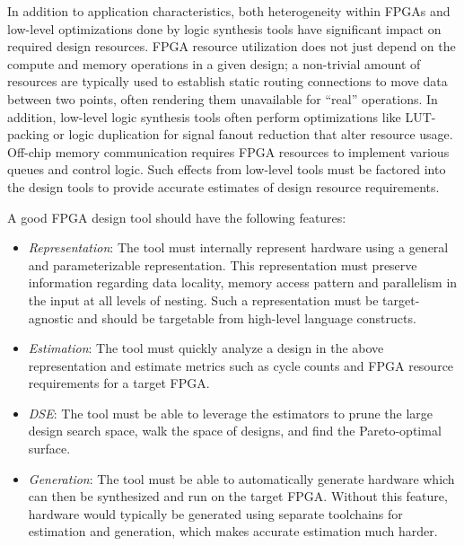 In addition to application characteristics, both heterogeneity within FPGAs
and low-level optimizations done by logic synthesis tools have
significant impact on required design resources. FPGA resource
utilization does not just depend on the compute and
memory operations in a given design; a non-trivial amount of resources are typically used
to establish static routing connections to move data between two points, often rendering them unavailable
for ``real'' operations. In addition, low-level
logic synthesis tools often perform optimizations like LUT-packing or logic duplication for signal fanout
reduction that alter resource usage. Off-chip memory communication requires FPGA
resources to implement various queues and control logic. Such effects from low-level tools
must be factored into the design tools to provide accurate estimates of design resource requirements.

A good FPGA design tool should have the following features:
\begin{itemize}
  \item \emph{Representation}: The tool must internally represent hardware using a general and parameterizable
    representation. This representation must preserve information regarding data locality,
    memory access pattern and parallelism in the input at all levels of nesting.
    Such a representation must be target-agnostic and should be targetable from high-level
    language constructs.
  \item \emph{Estimation}: The tool must quickly analyze a design in the above representation
    and estimate metrics such as cycle counts and FPGA resource requirements for a target FPGA.
  \item \emph{DSE}: The tool must be able to leverage the estimators to prune the large design search space,
    walk the space of designs, and find the Pareto-optimal surface.
  \item \emph{Generation}: The tool must be able to automatically generate hardware which can then be
    synthesized and run on the target FPGA. Without this feature, hardware would typically
    be generated using separate toolchains for estimation and generation, which makes
    accurate estimation much harder.
\end{itemize}

